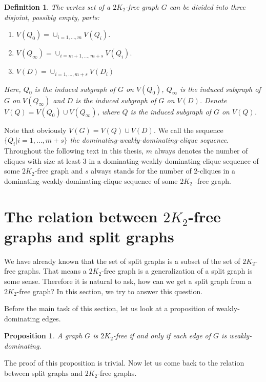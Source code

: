 \documentclass[12pt]{report}
\newtheorem{definition}{Definition}
\newtheorem{proposition}{Proposition}
\begin{document}
\begin{definition}\label{lm6}
The vertex set of a $2K_2$-free graph $G$ can be divided into three disjoint, 
possibly empty, parts:
\begin{enumerate}
\item $V(Q_0)=\cup_{i=1,\ldots,m}V(Q_i).$\label{Vq0}
\item $V(Q_{\infty})=\cup_{i=m+1,\ldots,m+s}V(Q_i).$\label{Vqinfty}
\item $V(D)=\cup_{i=1,\ldots,m+s}V(D_i)$\label{Vd}
\end{enumerate}
Here, $Q_0$ is the induced subgraph of $G$ on $V(Q_0)$, $Q_{\infty}$ is the induced subgraph of $G$ on $V(Q_{\infty})$ and $D$ is the induced subgraph of $G$ on $V(D)$. 
Denote $V(Q)=V(Q_0)\cup V(Q_{\infty})$, where $Q$ is the induced subgraph of $G$ on $V(Q)$. 
\end{definition}
Note that obviously $V(G)=V(Q)\cup V(D)$.
We call the sequence $\{Q_i|i=1,\ldots,m+s\}$ {\em the dominating-weakly-dominating-clique sequence}. Throughout the following text in this thesis, $m$ always denotes the number of cliques with size at least 3 in a dominating-weakly-dominating-clique sequence of some $2K_2$-free graph and $s$ always stands for the number of 2-cliques in a dominating-weakly-dominating-clique sequence of some $2K_2$
-free graph.













\section{The relation between $2K_2$-free graphs and split graphs}

We have already known that the set of split graphs is a subset of the set of $2K_2$-free graphs. That means a $2K_2$-free graph is a generalization of a split graph is some sense. Therefore it is natural to ask, how can we get a split graph from a $2K_2$-free graph? In this section, we try to answer this question.

Before the main task of this section, let us look at a proposition of weakly-dominating edges.

\begin{proposition}\label{2k2popeddo}
A graph $G$ is $2K_2$-free if and only if each edge of $G$ is weakly-dominating.
\end{proposition}
The proof of this proposition is trivial. Now let us come back to the relation between split graphs and $2K_2$-free graphs.
\end{document}
